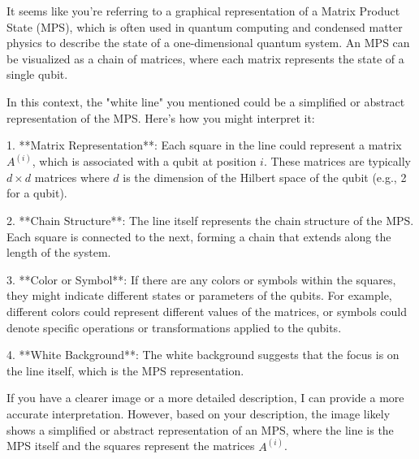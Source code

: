 It seems like you're referring to a graphical representation of a Matrix Product State (MPS), which is often used in quantum computing and condensed matter physics to describe the state of a one-dimensional quantum system. An MPS can be visualized as a chain of matrices, where each matrix represents the state of a single qubit.

In this context, the "white line" you mentioned could be a simplified or abstract representation of the MPS. Here's how you might interpret it:

1. **Matrix Representation**: Each square in the line could represent a matrix \(A^{(i)}\), which is associated with a qubit at position \(i\). These matrices are typically \(d \times d\) matrices where \(d\) is the dimension of the Hilbert space of the qubit (e.g., 2 for a qubit).

2. **Chain Structure**: The line itself represents the chain structure of the MPS. Each square is connected to the next, forming a chain that extends along the length of the system.

3. **Color or Symbol**: If there are any colors or symbols within the squares, they might indicate different states or parameters of the qubits. For example, different colors could represent different values of the matrices, or symbols could denote specific operations or transformations applied to the qubits.

4. **White Background**: The white background suggests that the focus is on the line itself, which is the MPS representation.

If you have a clearer image or a more detailed description, I can provide a more accurate interpretation. However, based on your description, the image likely shows a simplified or abstract representation of an MPS, where the line is the MPS itself and the squares represent the matrices \(A^{(i)}\).